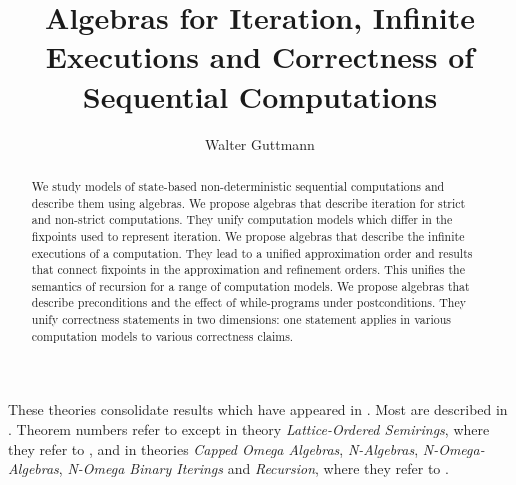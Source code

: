 \documentclass[11pt,a4paper]{article}
\begin{document}
\title{Algebras for Iteration, Infinite Executions and Correctness of Sequential Computations}
\author{Walter Guttmann}
\maketitle

\begin{abstract}
  We study models of state-based non-deterministic sequential computations and describe them using algebras.
  We propose algebras that describe iteration for strict and non-strict computations.
  They unify computation models which differ in the fixpoints used to represent iteration.
  We propose algebras that describe the infinite executions of a computation.
  They lead to a unified approximation order and results that connect fixpoints in the approximation and refinement orders.
  This unifies the semantics of recursion for a range of computation models.
  We propose algebras that describe preconditions and the effect of while-programs under postconditions.
  They unify correctness statements in two dimensions: one statement applies in various computation models to various correctness claims.
\end{abstract}

These theories consolidate results which have appeared in \cite{BerghammerGuttmann2015b,BerghammerGuttmann2017,Guttmann2009,Guttmann2010a,Guttmann2010d,Guttmann2011b,Guttmann2011a,Guttmann2012c,Guttmann2012b,Guttmann2012a,Guttmann2012d,Guttmann2013,Guttmann2014c,Guttmann2014b,Guttmann2014a,Guttmann2015b,Guttmann2015c,Guttmann2015a,Guttmann2016a,GuttmannStruthWeber2011b}.
Most are described in \cite{Guttmann2015b}.
Theorem numbers refer to \cite{Guttmann2015b} except in theory \emph{Lattice-Ordered Semirings}, where they refer to \cite{BerghammerGuttmann2017}, and in theories \emph{Capped Omega Algebras}, \emph{N-Algebras}, \emph{N-Omega-Algebras}, \emph{N-Omega Binary Iterings} and \emph{Recursion}, where they refer to \cite{Guttmann2016a}.

\tableofcontents

\begin{flushleft}

\end{flushleft}



\end{document}
